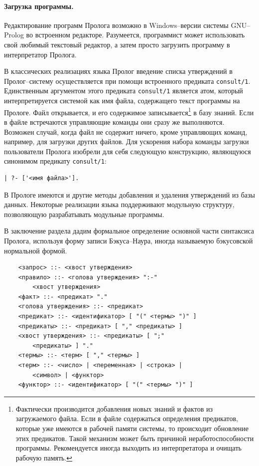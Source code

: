 \documentclass[12pt, openany, twoside]{book} %
\begin{document}
\paragraph{Загрузка программы.} Редактирование программ Пролога возможно в Windows--версии системы GNU--Prolog во встроенном редакторе. Разумеется, программист может использовать свой любимый текстовый редактор, а затем просто загрузить программу в интерпретатор Пролога.

В классических реализациях языка Пролог введение списка утверждений в Пролог--систему осуществляется при помощи встроенного предиката {\tt consult/1}. Единственным аргументом этого предиката {\tt consult/1} является атом, который интерпретируется системой как имя файла, содержащего текст программы на Прологе. Файл открывается, и его содержимое записывается\footnote{Фактически производится добавления новых знаний и фактов из загружаемого файла. Если в файле содержаться определения предикатов, которые уже имеются в рабочей памяти системы, то происходит обновление этих предикатов. Такой механизм может быть причиной неработоспособности программы. Рекомендуется иногда выходить из интерпретатора и очищать рабочую память.} в базу знаний. Если в файле встречаются управляющие команды они сразу же выполняются. Возможен случай, когда файл не содержит ничего, кроме управляющих команд, например, для загрузки других файлов. Для ускорения набора команды загрузки пользователи Пролога изобрели для себя следующую конструкцию, являющуюся синонимом предикату {\tt consult/1}:
{\tt\begin{verbatim}
| ?- ['<имя файла>'].
\end{verbatim}}

В Прологе имеются и другие методы добавления и удаления утверждений из базы данных. Некоторые реализации языка поддерживают модульную структуру, позволяющую разрабатывать модульные программы.

В заключение раздела дадим формальное определение основной части синтаксиса Пролога, используя форму записи Бэкуса--Наура, иногда называемую бэкусовской нормальной формой.

{\tt\begin{verbatim}
    <запрос> ::- <хвост утверждения>
    <правило> ::- <голова утверждения> ":-"
        <хвост утверждения>
    <факт> ::- <предикат> "."
    <голова утверждения> ::- <предикат>
    <предикат> ::- <идентификатор> [ "(" <термы> ")" ]
    <предикаты> ::- <предикат> [ "," <предикаты> ]
    <хвост утверждения> ::- <предикаты> [ ";"
        <предикаты> ] "."
    <термы> ::- <терм> [ "," <термы> ]
    <терм> ::- <число> | <переменная> | <строка> |
        <символ> | <функтор>
    <функтор> ::- <идентификатор> [ "(" <термы> ")" ]
\end{verbatim}}
\end{document}
